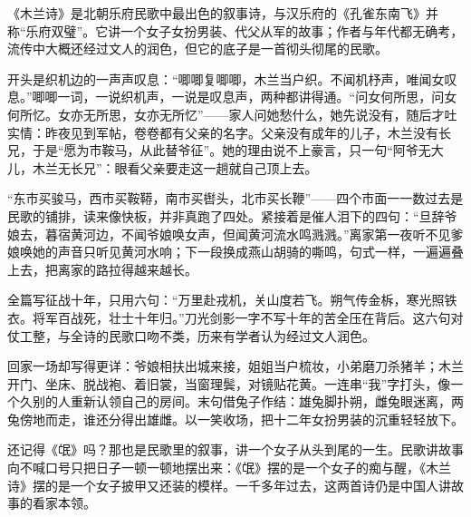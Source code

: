 \begin{appreciation}
《木兰诗》是北朝乐府民歌中最出色的叙事诗，与汉乐府的《孔雀东南飞》并称“乐府双璧”。它讲一个女子女扮男装、代父从军的故事；作者与年代都无确考，流传中大概还经过文人的润色，但它的底子是一首彻头彻尾的民歌。

开头是织机边的一声声叹息：“唧唧复唧唧，木兰当户织。不闻机杼声，唯闻女叹息。”唧唧一词，一说织机声，一说是叹息声，两种都讲得通。“问女何所思，问女何所忆。女亦无所思，女亦无所忆”——家人问她愁什么，她先说没有，随后才吐实情：昨夜见到军帖，卷卷都有父亲的名字。父亲没有成年的儿子，木兰没有长兄，于是“愿为市鞍马，从此替爷征”。她的理由说不上豪言，只一句“阿爷无大儿，木兰无长兄”：眼看父亲要走这一趟就自己顶上去。

“东市买骏马，西市买鞍鞯，南市买辔头，北市买长鞭”——四个市面一一数过去是民歌的铺排，读来像快板，并非真跑了四处。紧接着是催人泪下的四句：“旦辞爷娘去，暮宿黄河边，不闻爷娘唤女声，但闻黄河流水鸣溅溅。”离家第一夜听不见爹娘唤她的声音只听见黄河水响；下一段换成燕山胡骑的嘶鸣，句式一样，一遍遍叠上去，把离家的路拉得越来越长。

全篇写征战十年，只用六句：“万里赴戎机，关山度若飞。朔气传金柝，寒光照铁衣。将军百战死，壮士十年归。”刀光剑影一字不写十年的苦全压在背后。这六句对仗工整，与全诗的民歌口吻不类，历来有学者认为经过文人润色。

回家一场却写得更详：爷娘相扶出城来接，姐姐当户梳妆，小弟磨刀杀猪羊；木兰开门、坐床、脱战袍、着旧裳，当窗理鬓，对镜贴花黄。一连串“我”字打头，像一个久别的人重新认领自己的房间。末句借兔子作结：雄兔脚扑朔，雌兔眼迷离，两兔傍地而走，谁还分得出雄雌。以一笑收场，把十二年女扮男装的沉重轻轻放下。

还记得《氓》吗？那也是民歌里的叙事，讲一个女子从头到尾的一生。民歌讲故事向不喊口号只把日子一顿一顿地摆出来：《氓》摆的是一个女子的痴与醒，《木兰诗》摆的是一个女子披甲又还装的模样。一千多年过去，这两首诗仍是中国人讲故事的看家本领。
\end{appreciation}
